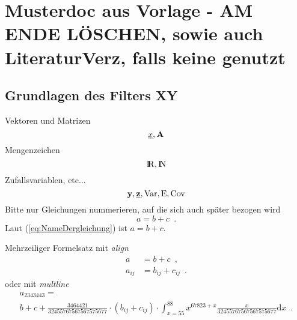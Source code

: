 \section{Musterdoc aus Vorlage - AM ENDE LÖSCHEN, sowie auch LiteraturVerz, falls keine genutzt}

\subsection{Grundlagen des Filters XY}
Vektoren und Matrizen
%
\begin{equation*}
	\underline{x}, {\mathbf A}
\end{equation*}
%
Mengenzeichen
%
\begin{equation*}
	\mathrm{I\hspace{-2pt}R}, \mathrm{I\hspace{-2pt}N}
\end{equation*}
%
Zufallsvariablen, etc...
%
\begin{equation*}
	{\mathbf y}, {\underline{{\mathbf z}}},
	\mathrm{Var}, \mathrm{E}, \mathrm{Cov}
\end{equation*}
%
Bitte nur Gleichungen nummerieren, auf die sich auch später bezogen wird
%
\begin{equation}
	a = b +c \enspace .
	\label{eq:NameDergleichung}
\end{equation}
%
Laut (\ref{eq:NameDergleichung}) ist $a=b+c$.

Mehrzeiliger Formelsatz mit \emph{align}
%
\begin{align*}
	a &= b + c \enspace ,\\
	a_{ij} &= b_{ij} + c_{ij} \enspace .
\end{align*}
%
oder mit \emph{multline}
%
\begin{multline*}
	a_{2343443} = \\
	b + c + \frac{3464421}{32455767567567575677} 
	\cdot \left( b_{ij} + c_{ij} \right)
	\cdot \int_{x=55}^{88} x^{67823+x} \frac{x}{32455767567567575677} \text{d}x
	\enspace .
\end{multline*}
%

%
